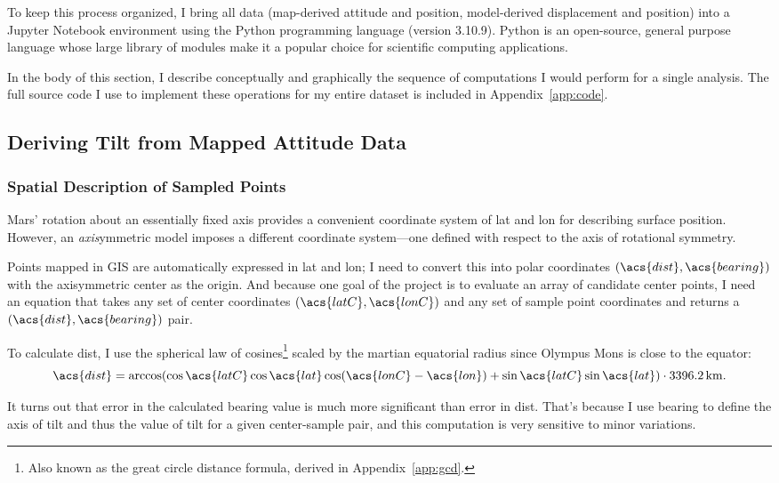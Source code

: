 To keep this process organized, I bring all data (map-derived attitude and position, model-derived displacement and position) into a Jupyter Notebook environment using the Python programming language (version 3.10.9). Python is an open-source, general purpose language whose large library of modules make it a popular choice for scientific computing applications.

In the body of this section, I describe conceptually and graphically the sequence of computations I would perform for a single analysis. The full source code I use to implement these operations for my entire dataset is included in Appendix~\ref{app:code}.

\subsection{Deriving Tilt from Mapped Attitude Data}\label{sec:tilt-from-map}

\subsubsection{Spatial Description of Sampled Points}

Mars' rotation about an essentially fixed axis provides a convenient coordinate system of \ac{lat} and \ac{lon} for describing surface position. However, an \emph{axis}ymmetric model imposes a different coordinate system---one defined with respect to the axis of rotational symmetry.

Points mapped in GIS are automatically expressed in \ac{lat} and \ac{lon}; I need to convert this into polar coordinates $(\acs{dist},\acs{bearing})$ with the axisymmetric center as the origin. And because one goal of the project is to evaluate an array of candidate center points, I need an equation that takes any set of center coordinates $(\acs{latC}, \acs{lonC})$ and any set of sample point coordinates and returns a $(\acs{dist},\acs{bearing})$ pair.

To calculate \acf{dist}, I use the spherical law of cosines\footnote{Also known as the great circle distance formula, derived in Appendix~\ref{app:gcd}.} scaled by the martian equatorial radius since Olympus Mons is close to the equator:
\begin{equation}
    \acs{dist}=\arccos(\cos\acs{latC}\cos\acs{lat}\cos(\acs{lonC}-\acs{lon}) + \sin\acs{latC}\sin\acs{lat})\cdot\qty{3396.2}{\km}.
\end{equation}

It turns out that error in the calculated \acs{bearing} value is much more significant than error in \acs{dist}. That's because I use \acs{bearing} to define the axis of tilt and thus the value of tilt for a given center-sample pair, and this computation is very sensitive to minor variations.


